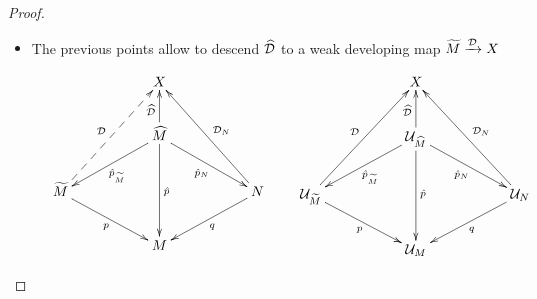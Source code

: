 \begin{proof}
\begin{itemize}
By Lemma \ref{lem:descend_developing_map}, the holonomy of $\U_{\widehat M} \rightarrow \U_{\widetilde M}$ is trivial, since this holonomy is given by $\hat \rho_{|\Gamma(\widehat M/\widetilde M )}$ we dedude that the continuous map $\widehat M \xrightarrow{\widehat \D} (X,\T^{\hat\rho})$ is invariant under the action of $\Gamma(\widehat M/\widetilde M)$.

\item The previous points allow to descend $\widehat {\mathcal{D}}$ to a weak developing map $\widetilde M \xrightarrow{\mathcal{D}} X$ 
\end{itemize}

\begin{figure}
  $$
  \xymatrix{ 
  &&X&&\\
 &&\widehat M \ar[drr]_{\hat p_N} 
 \ar[dd]^{\hat p} \ar[dll]^{\hat p_{\widetilde M}}
 \ar[u]^{\widehat \D}
 &&\\
 \widetilde M\ar[drr]_{p} \ar@{-->}[uurr]^{\D}&&&&N \ar[dll]^{q}\ar[uull]_{\D_N}
 \\&& M&& 
  }\quad \quad 
  \xymatrix{ 
  &&X&&\\
 &&\U_{\widehat M} \ar[drr]_{\hat p_N} 
 \ar[dd]^{\hat p} \ar[dll]^{\hat p_{\widetilde M}}
 \ar[u]^{\widehat \D}
 &&\\
 \U_{\widetilde M}\ar[drr]_{p} \ar[uurr]^{\D}&&&&\U_N \ar[dll]^{q}\ar[uull]_{\D_N}
 \\&& \U_M&& 
  }
$$

\end{figure}

 
 
 
\end{proof}








		
